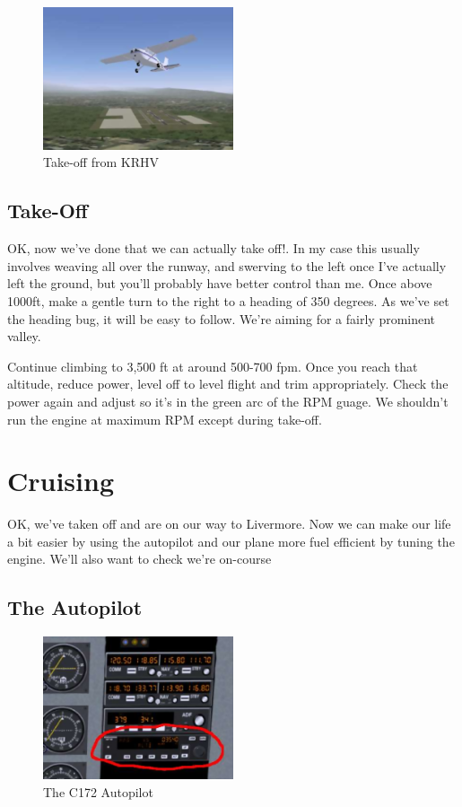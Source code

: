 \begin{figure}[!htp]
\centering
\includegraphics[width=0.5\textwidth]{takeoff}
\caption{Take-off from KRHV}
\end{figure}

\subsection{Take-Off}

OK, now we've done that we can actually take off!. In my case this usually
involves weaving all over the runway, and swerving to the left once
I've actually left the ground, but you'll probably have better control than me.
Once above 1000ft, make a gentle turn to the right to a heading of 350 degrees.
As we've set the heading bug, it will be easy to follow. We're aiming for a fairly prominent valley.


Continue climbing to 3,500 ft at around 500-700 fpm. Once you reach that altitude,
reduce power, level off to level flight and trim appropriately. Check the power
again and adjust so it's in the green arc of the RPM guage. We shouldn't run the
engine at maximum RPM except during take-off.

\section{Cruising}

OK, we've taken off and are on our way to Livermore. Now we can make our life a
bit easier by using the autopilot and our plane more fuel efficient by tuning
the engine. We'll also want to check we're on-course

\subsection{The Autopilot}

\begin{figure}[!htp]
\centering
\includegraphics[width=0.5\textwidth]{autopilot}
\caption{The C172 Autopilot\label{autopilot}}
\end{figure}

